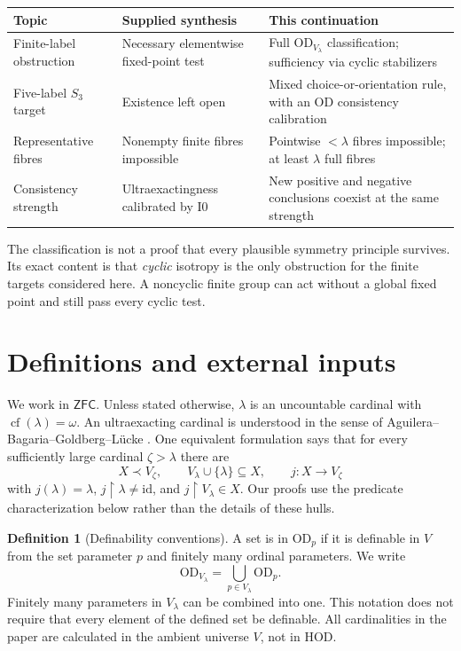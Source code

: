 \documentclass[11pt,letterpaper]{article}
\theoremstyle{definition}
\newtheorem{definition}{Definition}[section]
\numberwithin{equation}{section}
\newcommand{\ZFC}{\mathsf{ZFC}}
\newcommand{\OD}{\mathrm{OD}}
\newcommand{\cf}{\operatorname{cf}}
\newcommand{\id}{\mathrm{id}}
\newcommand{\restr}{\mathbin{\upharpoonright}}
\newcommand{\Izero}{\mathrm{I0}}
\begin{document}
\begin{center}
\small
\begin{tabularx}{\textwidth}{@{}P{.25\textwidth}YY@{}}
\toprule
Topic & Supplied synthesis & This continuation \\
\midrule
Finite-label obstruction & Necessary elementwise fixed-point test & Full $\OD_{V_\lambda}$ classification; sufficiency via cyclic stabilizers \\
Five-label $S_3$ target & Existence left open & Mixed choice-or-orientation rule, with an OD consistency calibration \\
Representative fibres & Nonempty finite fibres impossible & Pointwise $<\lambda$ fibres impossible; at least $\lambda$ full fibres \\
Consistency strength & Ultraexactingness calibrated by $\Izero$ & New positive and negative conclusions coexist at the same strength \\
\bottomrule
\end{tabularx}
\end{center}

The classification is not a proof that every plausible symmetry principle survives. Its exact content is that \emph{cyclic} isotropy is the only obstruction for the finite targets considered here. A noncyclic finite group can act without a global fixed point and still pass every cyclic test.

\section{Definitions and external inputs}\label{sec:definitions}

We work in $\ZFC$. Unless stated otherwise, $\lambda$ is an uncountable cardinal with $\cf(\lambda)=\omega$. An ultraexacting cardinal is understood in the sense of Aguilera--Bagaria--Goldberg--L\"ucke \cite{abgl}. One equivalent formulation says that for every sufficiently large cardinal $\zeta>\lambda$ there are
\[
 X\prec V_\zeta,\qquad V_\lambda\cup\{\lambda\}\subseteq X,
 \qquad j:X\longrightarrow V_\zeta
\]
with $j(\lambda)=\lambda$, $j\restr\lambda\ne\id$, and $j\restr V_\lambda\in X$. Our proofs use the predicate characterization below rather than the details of these hulls.

\begin{definition}[Definability conventions]
A set is in $\OD_p$ if it is definable in $V$ from the set parameter $p$ and finitely many ordinal parameters. We write
\[
 \OD_{V_\lambda}=\bigcup_{p\in V_\lambda}\OD_p.
\]
Finitely many parameters in $V_\lambda$ can be combined into one. This notation does not require that every element of the defined set be definable. All cardinalities in the paper are calculated in the ambient universe $V$, not in HOD.
\end{definition}
\end{document}
